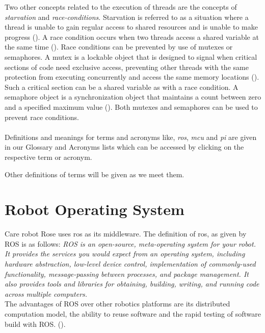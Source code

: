 \documentclass[12pt]{scrreprt}
\begin{document}
\par
Two other concepts related to the execution of threads are the concepts of \textit{starvation} and \textit{race-conditions}. Starvation is referred to as a situation where a thread is unable to gain regular access to shared resources and is unable to make progress (\cite{livelock_starvation}). A race condition occurs when two threads access a shared variable at the same time (\cite{race_condition}). Race conditions can be prevented by use of mutexes or semaphores. A mutex is a lockable object that is designed to signal when critical sections of code need exclusive access, preventing other threads with the same protection from executing concurrently and access the same memory locations (\cite{mutex}). Such a critical section can be a shared variable as with a race condition. A semaphore object is a synchronization object that maintains a count between zero and a specified maximum value (\cite{semaphore}). Both mutexes and semaphores can be used to prevent race conditions.
\\\\
Definitions and meanings for terms and acronyms like, \textit{\acrshort{ros}}, \textit{\acrshort{mcu}} and \textit{\acrshort{pi}} are given in our Glossary and Acronyms lists which can be accessed by clicking on the respective term or acronym.
\par
Other definitions of terms will be given as we meet them.
    

\section{Robot Operating System}
\label{tROS}
Care robot Rose uses \acrfull{ros} as its middleware. The definition of \acrfull{ros}, as given by ROS \cite{ros_wiki_introducton} is as follows:
\textit{ROS is an open-source, meta-operating system for your robot. It provides the services you would expect from an operating system, including hardware abstraction, low-level device control, implementation of commonly-used functionality, message-passing between processes, and package management. It also provides tools and libraries for obtaining, building, writing, and running code across multiple computers.}\\
 The advantages of ROS over other robotics platforms are its distributed computation model, the ability to reuse software and the rapid testing of software build with ROS. (\cite{agitr}).
 
\end{document}
